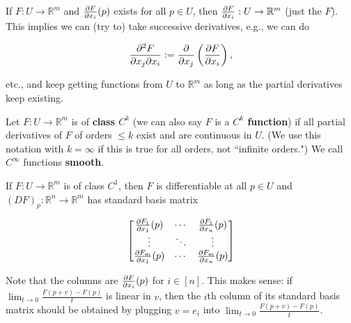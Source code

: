  \begin{remark}
 
 If \(F: U \to \mathbb{R}^m\) and \(\pderiv{F}{x_i}(p)\) exists for all \(p \in U\), then \(\pderiv{F}{x_i}: U \to \mathbb{R}^m\) (just the \(F\)). This implies we can (try to) take successive derivatives, e.g., we can do
 
 \[
 \pderiv{^2 F}{x_j \partial x_i} := \pderiv{}{x_j} \left( \pderiv{F}{x_i} \right) ,
 \]
 
 etc., and keep getting functions from \(U\) to \(\mathbb{R}^m\) as long as the partial derivatives keep existing.
 
 \end{remark}
 
 \begin{definition}
 
 Let \(F: U \to \mathbb{R}^m\) is of \textbf{class \(C^k\)} (we can also say \(F\) is a \textbf{\(C^k\) function}) if all partial derivatives of \(F\) of orders \(\leq k\) exist and are continuous in \(U\). (We use this notation with \(k = \infty\) if this is true for all orders, not ``infinite orders.") We call \(C^\infty\) functions \textbf{smooth}.
 
 \end{definition}
 
 \begin{theorem}\label{ra.thm.jacobian}
 
 If \(F: U \to \mathbb{R}^m\) is of class \(C^1\), then \(F\) is differentiable at all \(p \in U\) and \( (DF)_p : \mathbb{R}^n \to \mathbb{R}^m\) has standard basis matrix
 
 \begin{equation}\label{ra.thm.jacobian.mat}
 \begin{bmatrix}
 \pderiv{F_1}{x_1}(p) & \cdots & \pderiv{F_1}{x_n}(p) \\
 \vdots & \ddots & \vdots \\
 \pderiv{F_m}{x_1}(p) & \cdots & \pderiv{F_m}{x_n}(p)
 \end{bmatrix}
 \end{equation}
 

 
 \end{theorem}
 
 \begin{remark}
 
  Note that the columns are \(\pderiv{F}{x_i}(p)\) for \(i \in [n]\). This makes sense: if \(\lim_{t \to 0} \frac{F(p+v) - F(p)}{t}\) is linear in \(v\), then the \(i\)th column of its standard basis matrix should be obtained by plugging \(v=e_i\) into \(\lim_{t \to 0} \frac{F(p+v) - F(p)}{t}\).
  
  \end{remark}
  
